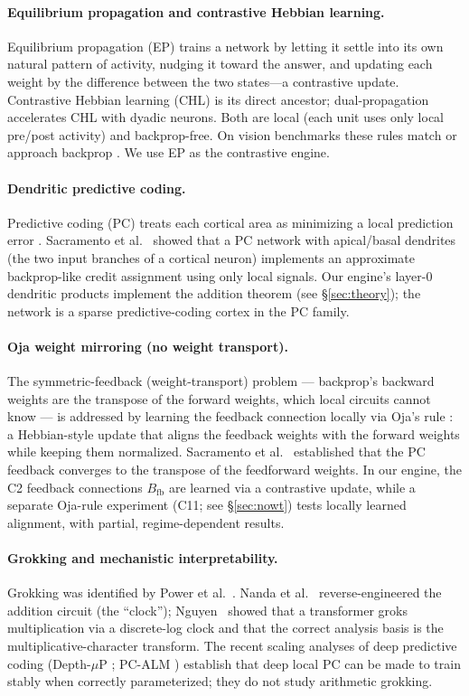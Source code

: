 \documentclass[11pt]{article}
\begin{document}
\paragraph{Equilibrium propagation and contrastive Hebbian learning.}
Equilibrium propagation (EP) \cite{scellier2017} trains a network by letting it settle into its own natural pattern of activity, nudging it toward the answer, and updating each weight by the difference between the two states---a contrastive update. Contrastive Hebbian learning (CHL) is its direct ancestor; dual-propagation \cite{hoier2023} accelerates CHL with dyadic neurons. Both are local (each unit uses only local pre/post activity) and backprop-free. On vision benchmarks these rules match or approach backprop \cite{hoier2023,hoier2024}. We use EP as the contrastive engine.

\paragraph{Dendritic predictive coding.}
Predictive coding (PC) treats each cortical area as minimizing a local prediction error \cite{raoballard1999}. Sacramento et al.~\cite{sacramento2018} showed that a PC network with apical/basal dendrites (the two input branches of a cortical neuron) implements an approximate backprop-like credit assignment using only local signals. Our engine's layer-0 dendritic products implement the addition theorem (see \S\ref{sec:theory}); the network is a sparse predictive-coding cortex in the PC family.

\paragraph{Oja weight mirroring (no weight transport).}
The symmetric-feedback (weight-transport) problem --- backprop's backward weights are the transpose of the forward weights, which local circuits cannot know --- is addressed by learning the feedback connection locally via Oja's rule \cite{oja1982}: a Hebbian-style update that aligns the feedback weights with the forward weights while keeping them normalized. Sacramento et al.~\cite{sacramento2018} established that the PC feedback converges to the transpose of the feedforward weights. In our engine, the C2 feedback connections $B_{\mathrm{fb}}$ are learned via a contrastive update, while a separate Oja-rule experiment (C11; see \S\ref{sec:nowt}) tests locally learned alignment, with partial, regime-dependent results.

\paragraph{Grokking and mechanistic interpretability.}
Grokking was identified by Power et al.~\cite{power2022}. Nanda et al.~\cite{nanda2023} reverse-engineered the addition circuit (the ``clock''); Nguyen~\cite{nguyen2026} showed that a transformer groks multiplication via a discrete-log clock and that the correct analysis basis is the multiplicative-character transform. The recent scaling analyses of deep predictive coding (Depth-$\mu$P \cite{innocenti2025}; PC-ALM \cite{seely2026}) establish that deep local PC can be made to train stably when correctly parameterized; they do not study arithmetic grokking.
\end{document}
